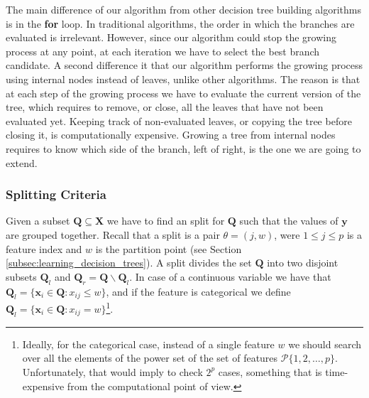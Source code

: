 The main difference of our algorithm from other decision tree building algorithms is in the \textbf{for} loop. In traditional algorithms, the order in which the branches are evaluated is irrelevant. However, since our algorithm could stop the growing process at any point, at each iteration we have to select the best branch candidate. A second difference it that our algorithm performs the growing process using internal nodes instead of leaves, unlike other algorithms. The reason is that at each step of the growing process we have to evaluate the current version of the tree, which requires to remove, or close, all the leaves that have not been evaluated yet. Keeping track of non-evaluated leaves, or copying the tree before closing it, is computationally expensive. Growing a tree from internal nodes requires to know which side of the branch, left of right, is the one we are going to extend.

\subsubsection*{Splitting Criteria}
\label{sub:splitting_criteria}

Given a subset $\mathbf{Q} \subseteq \mathbf{X}$ we have to find an split for $\mathbf{Q}$ such that the values of $\textbf{y}$ are grouped together. Recall that a split is a pair $\theta = (j,w)$, were $1 \leq j \leq p$ is a feature index and $w$ is the partition point (see Section \ref{subsec:learning_decision_trees}). A split divides the set $\mathbf{Q}$ into two disjoint subsets $\mathbf{Q}_l$ and $\mathbf{Q}_r = \mathbf{Q} \backslash \mathbf{Q}_l$. In case of a continuous variable we have that $\mathbf{Q}_l = \{\mathbf{x}_i \in \mathbf{Q} : x_{ij} \leq w\}$, and if the feature is categorical we define $\mathbf{Q}_l = \{\mathbf{x}_i \in \mathbf{Q} : x_{ij} = w\}$\footnote{Ideally, for the categorical case, instead of a single feature $w$ we should search over all the elements of the power set of the set of features $\mathcal{P} \{1, 2, \ldots, p \}$. Unfortunately, that would imply to check $2^p$ cases, something that is time-expensive from the computational point of view.}.

